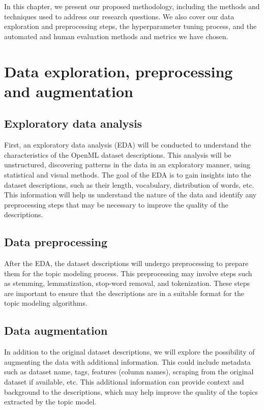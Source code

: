 \label{sec:methodology}
In this chapter, we present our proposed methodology, including the methods and techniques used to address our research questions. We also cover our data exploration and preprocessing steps, the hyperparameter tuning process, and the automated and human evaluation methods and metrics we have chosen.

\section{Data exploration, preprocessing and augmentation}
\subsection{Exploratory data analysis}
First, an exploratory data analysis (EDA) will be conducted to understand the characteristics of the OpenML dataset descriptions. This analysis will be unstructured, discovering patterns in the data in an exploratory manner, using statistical and visual methods. The goal of the EDA is to gain insights into the dataset descriptions, such as their length, vocabulary, distribution of words, etc. This information will help us understand the nature of the data and identify any preprocessing steps that may be necessary to improve the quality of the descriptions.

\subsection{Data preprocessing}
After the EDA, the dataset descriptions will undergo preprocessing to prepare them for the topic modeling process. This preprocessing may involve steps such as stemming, lemmatization, stop-word removal, and tokenization. These steps are important to ensure that the descriptions are in a suitable format for the topic modeling algorithms.

\subsection{Data augmentation}
In addition to the original dataset descriptions, we will explore the possibility of augmenting the data with additional information. This could include metadata such as dataset name, tags, features (column names), scraping from the original dataset if available, etc. This additional information can provide context and background to the descriptions, which may help improve the quality of the topics extracted by the topic model.

